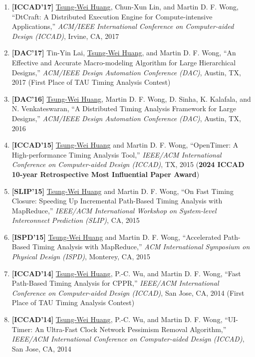 \documentclass[A4,11pt]{article}
\begin{document}
\begin{enumerate}
    \item \textbf{[ICCAD'17]} \underline{Tsung-Wei Huang}, Chun-Xun Lin, and Martin D. F. Wong, ``DtCraft: A Distributed Execution Engine for Compute-intensive Applications,'' \textit{ACM/IEEE International Conference on Computer-aided Design (ICCAD)}, Irvine, CA, 2017

    \item \textbf{[DAC'17]} Tin-Yin Lai, \underline{Tsung-Wei Huang}, and Martin D. F. Wong, ``An Effective and Accurate Macro-modeling Algorithm for Large Hierarchical Designs,'' \textit{ACM/IEEE Design Automation Conference (DAC)}, Austin, TX, 2017 (First Place of TAU Timing Analysis Contest)

    \item \textbf{[DAC'16]} \underline{Tsung-Wei Huang}, Martin D. F. Wong, D. Sinha, K. Kalafala, and N. Venkateswaran, ``A Distributed Timing Analysis Framework for Large Designs,'' \textit{ACM/IEEE Design Automation Conference (DAC)}, Austin, TX, 2016

    \item \textbf{[ICCAD'15]} \underline{Tsung-Wei Huang} and Martin D. F. Wong, ``OpenTimer: A High-performance Timing Analysis Tool,'' \textit{IEEE/ACM International Conference on Computer-aided Design (ICCAD)}, TX, 2015 (\textbf{2024 ICCAD 10-year Retrospective Most Influential Paper Award})

    \item \textbf{[SLIP'15]} \underline{Tsung-Wei Huang} and Martin D. F. Wong, ``On Fast Timing Closure: Speeding Up Incremental Path-Based Timing Analysis with MapReduce,'' \textit{IEEE/ACM International Workshop on System-level Interconnect Prediction (SLIP)}, CA, 2015

    \item \textbf{[ISPD'15]} \underline{Tsung-Wei Huang} and Martin D. F. Wong, ``Accelerated Path-Based Timing Analysis with MapReduce,'' \textit{ACM International Symposium on Physical Design (ISPD)}, Monterey, CA, 2015

    \item \textbf{[ICCAD'14]} \underline{Tsung-Wei Huang}, P.-C. Wu, and Martin D. F. Wong, ``Fast Path-Based Timing Analysis for CPPR,'' \textit{IEEE/ACM International Conference on Computer-aided Design (ICCAD)}, San Jose, CA, 2014 (First Place of TAU Timing Analysis Contest)

    \item \textbf{[ICCAD'14]} \underline{Tsung-Wei Huang}, P.-C. Wu, and Martin D. F. Wong, ``UI-Timer: An Ultra-Fast Clock Network Pessimism Removal Algorithm,'' \textit{IEEE/ACM International Conference on Computer-aided Design (ICCAD)}, San Jose, CA, 2014 


\end{enumerate}
\end{document}
